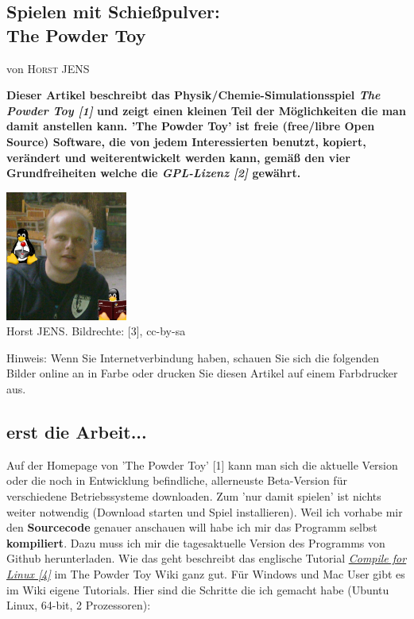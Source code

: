 \documentclass[10pt,a4paper,ngerman,twoside]{article} %
\newcommand{\NewsItem}[1]{ %
\usefont{T1}{fvs}{n}{n} %
\vspace{24pt}\large #1\vspace{3pt} %
\par \normalsize \normalfont}
\newcommand{\NewsAuthor}[1]{ %
\hfill von \textsc{#1} \vspace{20pt} %
\par \normalfont}
\begin{document}
\begin{multicols}{3}
\NewsItem{}
\section*{Spielen mit Schießpulver: \\
The Powder Toy}
\label{powdertoy}
\NewsAuthor{Horst JENS}

\textbf{Dieser Artikel beschreibt das Physik/Chemie-Simulationsspiel \textit{The Powder Toy [1]} und zeigt einen kleinen Teil der Möglichkeiten die man damit anstellen kann. 'The Powder Toy' ist freie (free/libre Open Source) Software, die von jedem Interessierten benutzt, kopiert, verändert und weiterentwickelt werden kann, gemäß den vier Grundfreiheiten welche die \textit{GPL-Lizenz [2]} gewährt.}

\begin{center}
\includegraphics[width=4cm]{horst2011mitdoppeltux.jpg} \\
\footnotesize{Horst JENS. Bildrechte: [3], cc-by-sa}
\end{center}


{Hinweis:} Wenn Sie Internetverbindung haben, schauen Sie sich die folgenden Bilder online an in Farbe oder drucken Sie diesen Artikel auf einem Farbdrucker aus.

\subsection*{erst die Arbeit...}

Auf der Homepage von 'The Powder Toy' [1] kann man sich die aktuelle Version oder die noch in Entwicklung befindliche, allerneuste Beta-Version für verschiedene Betriebssysteme downloaden. Zum 'nur damit spielen' ist nichts weiter notwendig (Download starten und Spiel installieren). Weil ich vorhabe mir den \textbf{Sourcecode} genauer anschauen will habe ich mir das Programm selbst \textbf{kompiliert}. Dazu muss ich mir die tagesaktuelle Version des Programms von Github herunterladen. Wie das geht beschreibt das englische Tutorial \href{http://goo.gl/LK4z01}{\textit{Compile for Linux [4]}} im The Powder Toy Wiki ganz gut. Für Windows und Mac User gibt es im Wiki eigene Tutorials. Hier sind die Schritte die ich gemacht habe (Ubuntu Linux, 64-bit, 2 Prozessoren):


\end{multicols}
\end{document}
